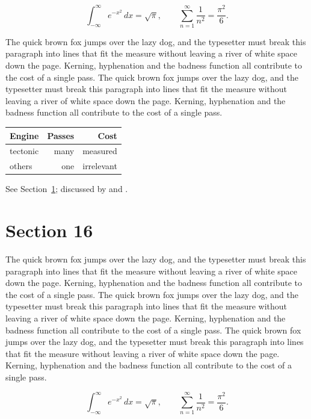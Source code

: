 \documentclass{article}
\begin{document}
\begin{equation}\label{eq:15}
\int_{-\infty}^{\infty} e^{-x^{2}}\,dx = \sqrt{\pi}, \qquad
\sum_{n=1}^{\infty} \frac{1}{n^{2}} = \frac{\pi^{2}}{6}.
\end{equation}

The quick brown fox jumps over the lazy dog, and the typesetter must break this paragraph into lines that fit the measure without leaving a river of white space down the page. Kerning, hyphenation and the badness function all contribute to the cost of a single pass. The quick brown fox jumps over the lazy dog, and the typesetter must break this paragraph into lines that fit the measure without leaving a river of white space down the page. Kerning, hyphenation and the badness function all contribute to the cost of a single pass. 

\begin{center}
\begin{tabular}{lrr}
\toprule
Engine & Passes & Cost \\
\midrule
tectonic & many & measured \\
others & one & irrelevant \\
\bottomrule
\end{tabular}
\end{center}

See Section~\ref{sec:16}; discussed by \textcite{k1} and \textcite{l3}.
\section{Section 16}
\label{sec:16}
The quick brown fox jumps over the lazy dog, and the typesetter must break this paragraph into lines that fit the measure without leaving a river of white space down the page. Kerning, hyphenation and the badness function all contribute to the cost of a single pass. The quick brown fox jumps over the lazy dog, and the typesetter must break this paragraph into lines that fit the measure without leaving a river of white space down the page. Kerning, hyphenation and the badness function all contribute to the cost of a single pass. The quick brown fox jumps over the lazy dog, and the typesetter must break this paragraph into lines that fit the measure without leaving a river of white space down the page. Kerning, hyphenation and the badness function all contribute to the cost of a single pass. 

\begin{equation}\label{eq:16}
\int_{-\infty}^{\infty} e^{-x^{2}}\,dx = \sqrt{\pi}, \qquad
\sum_{n=1}^{\infty} \frac{1}{n^{2}} = \frac{\pi^{2}}{6}.
\end{equation}
\end{document}
